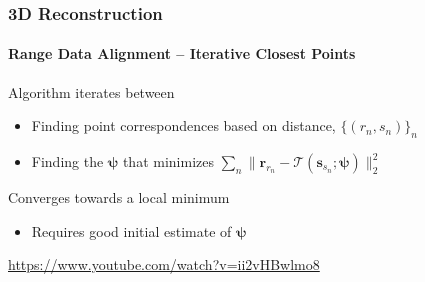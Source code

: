 \documentclass[xetex,professionalfont]{beamer}
\renewcommand{\vec}[1]{\ensuremath{\mathbf{#1}}}
\newcommand{\vr}{\vec{r}}
\newcommand{\vs}{\vec{s}}
\newcommand{\trans}{\mathcal{T}}
\begin{document}

\begin{frame}
\frametitle{3D Reconstruction}
\framesubtitle{Range Data Alignment -- Iterative Closest Points}

Algorithm iterates between
\begin{itemize}
	\item Finding point correspondences based on distance, $\{(r_n,s_n)\}_n$ %
	\item Finding the $\boldsymbol{\psi}$ that minimizes $\sum_n\lVert\vr_{r_n}-\trans(\vs_{s_n};\boldsymbol{\psi}) \rVert_2^2$ %
\end{itemize}

\bigskip
Converges towards a local minimum
\begin{itemize}
	\item Requires good initial estimate of $\boldsymbol{\psi}$
\end{itemize}

\bigskip
\begin{center}
	\url{https://www.youtube.com/watch?v=ii2vHBwlmo8}
\end{center}


\end{frame}

\end{document}
